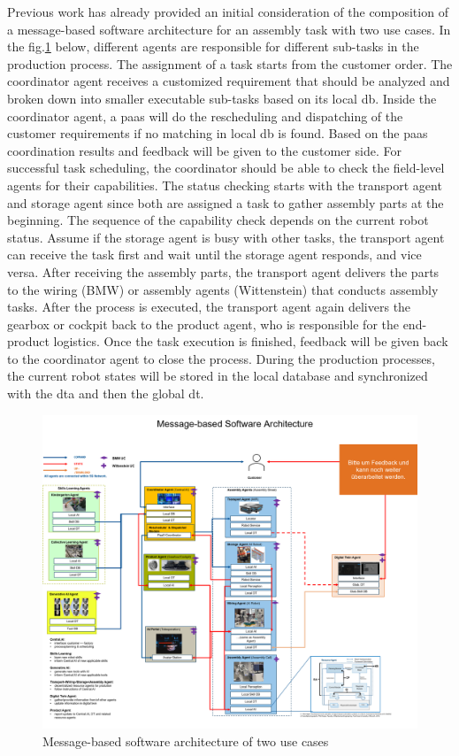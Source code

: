 Previous work has already provided an initial consideration of the composition 
of a message-based software architecture for an assembly task with two use cases. 
In the
fig.\ref{fig: Msg-based-SW-architecture} below, different agents are responsible for different sub-tasks in the 
production process. The assignment of a task starts from the customer order. 
The coordinator agent receives a customized requirement that should be analyzed 
and broken down 
into smaller executable sub-tasks based on its local \gls{db}. Inside the coordinator 
agent, a \gls{paas} will do the rescheduling and dispatching of the customer 
requirements if no matching in local \gls{db} is found. Based on the \gls{paas} 
coordination results and feedback will be given to the customer side. For successful 
task scheduling, the coordinator should be able to check the field-level 
agents for their capabilities. The status checking starts with the transport agent 
and storage agent since both are assigned a task to gather 
assembly parts at the beginning. The sequence of the capability check 
depends on the current robot status. Assume if the storage agent is busy with 
other tasks, the transport agent can receive the task first and wait until 
the storage agent responds, and vice versa. After receiving the assembly parts, the transport 
agent delivers the parts to the wiring (BMW) or assembly agents (Wittenstein) that 
conducts assembly tasks. After the process is executed, the transport 
agent again delivers the gearbox or cockpit back to the product agent, who is 
responsible for the end-product logistics. Once the task execution is 
finished, feedback will be given back to the coordinator agent to close 
the process. During the production processes, the current robot states will be 
stored in the local database and synchronized with the \gls{dta} and 
then the global \gls{dt}.


\begin{figure}[htb]
    \includegraphics[width=\textwidth]{figures/Prelimilary/Msg-based-Software-Architecture.png}
    \centering
    \caption{Message-based software architecture of two use cases\label{fig: Msg-based-SW-architecture}}
    \end{figure}


